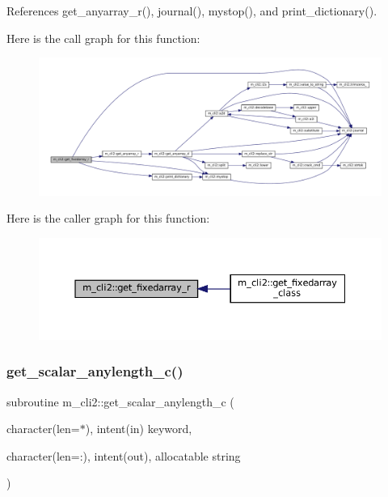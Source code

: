 References get\+\_\+anyarray\+\_\+r(), journal(), mystop(), and print\+\_\+dictionary().

Here is the call graph for this function\+:
\nopagebreak
\begin{figure}[H]
\begin{center}
\leavevmode
\includegraphics[width=350pt]{namespacem__cli2_afbec790abad0dca990c0a61cd2d9e9ae_cgraph}
\end{center}
\end{figure}
Here is the caller graph for this function\+:\nopagebreak
\begin{figure}[H]
\begin{center}
\leavevmode
\includegraphics[width=350pt]{namespacem__cli2_afbec790abad0dca990c0a61cd2d9e9ae_icgraph}
\end{center}
\end{figure}
\mbox{\label{namespacem__cli2_a7429381c83a021ba3ffb32ed58e17a0e}} 
\subsubsection{\texorpdfstring{get\+\_\+scalar\+\_\+anylength\+\_\+c()}{get\_scalar\_anylength\_c()}}
{\footnotesize\ttfamily subroutine m\+\_\+cli2\+::get\+\_\+scalar\+\_\+anylength\+\_\+c (\begin{DoxyParamCaption}\item[{character(len=$\ast$), intent(in)}]{keyword,  }\item[{character(len=\+:), intent(out), allocatable}]{string }\end{DoxyParamCaption})\hspace{0.3cm}{\ttfamily [private]}}



